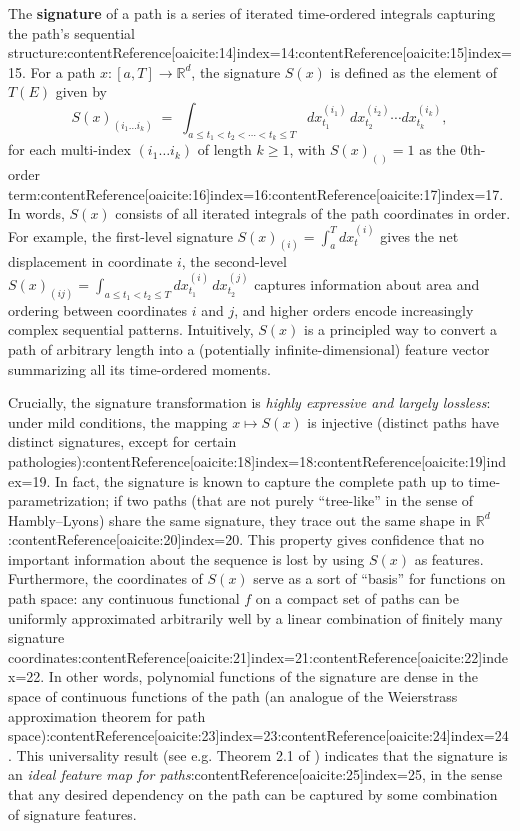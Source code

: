 \documentclass[11pt]{article}
\begin{document}
The \textbf{signature} of a path is a series of iterated time-ordered integrals capturing the path's sequential structure:contentReference[oaicite:14]{index=14}:contentReference[oaicite:15]{index=15}. For a path $x:[a,T]\to\mathbb{R}^d$, the signature $S(x)$ is defined as the element of $T(E)$ given by 
\begin{equation}
\label{eq:signature-def}
S(x)_{(i_1 \ldots i_k)} \;=\; \int_{a \le t_1 < t_2 < \cdots < t_k \le T} dx_{t_1}^{(i_1)}\,dx_{t_2}^{(i_2)}\cdots dx_{t_k}^{(i_k)},
\end{equation}
for each multi-index $(i_1\ldots i_k)$ of length $k\ge 1$, with $S(x)_{()}=1$ as the 0th-order term:contentReference[oaicite:16]{index=16}:contentReference[oaicite:17]{index=17}. In words, $S(x)$ consists of all iterated integrals of the path coordinates in order. For example, the first-level signature $S(x)_{(i)}=\int_a^T dx_t^{(i)}$ gives the net displacement in coordinate $i$, the second-level $S(x)_{(ij)}=\int_{a\le t_1 < t_2 \le T} dx_{t_1}^{(i)}\,dx_{t_2}^{(j)}$ captures information about area and ordering between coordinates $i$ and $j$, and higher orders encode increasingly complex sequential patterns. Intuitively, $S(x)$ is a principled way to convert a path of arbitrary length into a (potentially infinite-dimensional) feature vector summarizing all its time-ordered moments.

Crucially, the signature transformation is \emph{highly expressive and largely lossless}: under mild conditions, the mapping $x \mapsto S(x)$ is injective (distinct paths have distinct signatures, except for certain pathologies):contentReference[oaicite:18]{index=18}:contentReference[oaicite:19]{index=19}. In fact, the signature is known to capture the complete path up to time-parametrization; if two paths (that are not purely ``tree-like'' in the sense of Hambly–Lyons) share the same signature, they trace out the same shape in $\mathbb{R}^d$:contentReference[oaicite:20]{index=20}. This property gives confidence that no important information about the sequence is lost by using $S(x)$ as features. Furthermore, the coordinates of $S(x)$ serve as a sort of ``basis'' for functions on path space: any continuous functional $f$ on a compact set of paths can be uniformly approximated arbitrarily well by a linear combination of finitely many signature coordinates:contentReference[oaicite:21]{index=21}:contentReference[oaicite:22]{index=22}. In other words, polynomial functions of the signature are dense in the space of continuous functions of the path (an analogue of the Weierstrass approximation theorem for path space):contentReference[oaicite:23]{index=23}:contentReference[oaicite:24]{index=24}. This universality result (see e.g. Theorem 2.1 of \cite{Lemercier2021}) indicates that the signature is an \emph{ideal feature map for paths}:contentReference[oaicite:25]{index=25}, in the sense that any desired dependency on the path can be captured by some combination of signature features.
\end{document}
